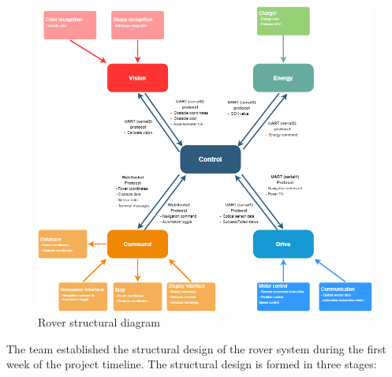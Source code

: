 \documentclass[11pt, a4paper]{article}
\begin{document}
\begin{figure} [h!]
    \centering
    \includegraphics[scale=0.5]{Structure.png}
    \caption{Rover structural diagram}
\end{figure}

The team established the structural design of the rover system during the first week of the project timeline. The structural design is formed in three stages: 
\end{document}
